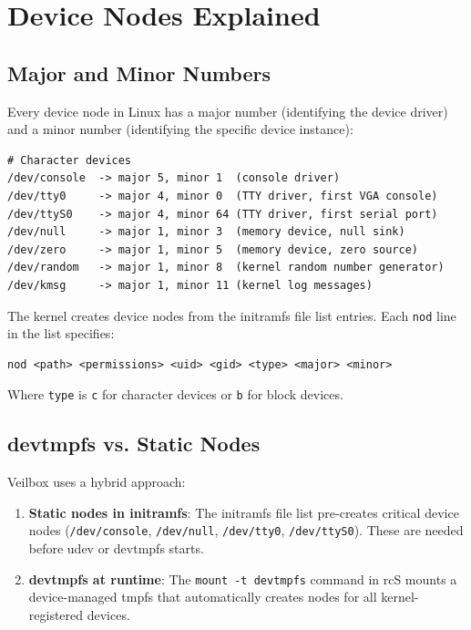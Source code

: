 \section{Device Nodes Explained}

\subsection{Major and Minor Numbers}

Every device node in Linux has a major number (identifying the device driver)
and a minor number (identifying the specific device instance):

\begin{lstlisting}
# Character devices
/dev/console  -> major 5, minor 1  (console driver)
/dev/tty0     -> major 4, minor 0  (TTY driver, first VGA console)
/dev/ttyS0    -> major 4, minor 64 (TTY driver, first serial port)
/dev/null     -> major 1, minor 3  (memory device, null sink)
/dev/zero     -> major 1, minor 5  (memory device, zero source)
/dev/random   -> major 1, minor 8  (kernel random number generator)
/dev/kmsg     -> major 1, minor 11 (kernel log messages)
\end{lstlisting}

The kernel creates device nodes from the initramfs file list entries.
Each \texttt{nod} line in the list specifies:

\begin{lstlisting}
nod <path> <permissions> <uid> <gid> <type> <major> <minor>
\end{lstlisting}

Where \texttt{type} is \texttt{c} for character devices or \texttt{b} for
block devices.

\subsection{devtmpfs vs. Static Nodes}

Veilbox uses a hybrid approach:

\begin{enumerate}[nosep]
  \item \textbf{Static nodes in initramfs}: The initramfs file list
        pre-creates critical device nodes (\texttt{/dev/console},
        \texttt{/dev/null}, \texttt{/dev/tty0}, \texttt{/dev/ttyS0}).
        These are needed before udev or devtmpfs starts.
  \item \textbf{devtmpfs at runtime}: The \texttt{mount -t devtmpfs}
        command in rcS mounts a device-managed tmpfs that automatically
        creates nodes for all kernel-registered devices.
\end{enumerate}

